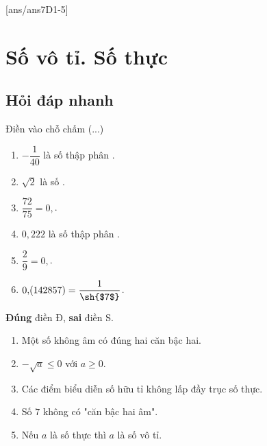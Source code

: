 [ans/ans7D1-5]

\section{Số vô tỉ. Số thực}
\subsection{Hỏi đáp nhanh}
\begin{ex}%
	Điền vào chỗ chấm (...)
	\begin{enumerate}
		\item $-\dfrac{1}{40}$ là số thập phân .
		\item $\sqrt 2 $ là số .
		\item $\dfrac{72}{75}=0{,}$.
		\item $0{,}222$ là số thập phân .
		\item $\dfrac{2}{9}=0{,}$.
		\item $0{,}(142857)=\dfrac{1}{\text{\sh{$7$}}}$.
	\end{enumerate}
\end{ex}

\begin{ex}%
	\textbf{Đúng} điền Đ, \textbf{sai} điền S.
	\begin{enumerate}
		\item {} Một số không âm có đúng hai căn bậc hai.
		\item {} $-\sqrt a\le 0$ với $a\ge 0$.
		\item {} Các điểm biểu diễn số hữu tỉ không lấp đầy trục số thực.
		\item {} Số $7$ không có "căn bậc hai âm".
		\item {} Nếu $a$ là số thực thì $a$ là số vô tỉ.
	\end{enumerate}
\end{ex}
